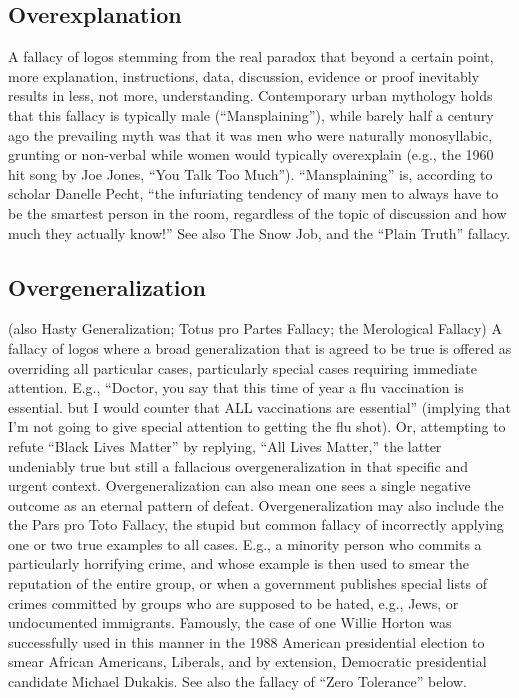 \documentclass[10pt,a4paper,british]{article}
\begin{document}
\begin{multicols}{2}
    \subsection{Overexplanation} A fallacy of logos stemming from the real
    paradox that beyond a certain point, more explanation, instructions, data,
    discussion, evidence or proof inevitably results in less, not more,
    understanding. Contemporary urban mythology holds that this fallacy is
    typically male (``Mansplaining''), while barely half a century ago the
    prevailing myth was that it was men who were naturally monosyllabic,
    grunting or non{-}verbal while women would typically overexplain (e.g., the
    1960 hit song by Joe Jones, ``You Talk Too Much''). ``Mansplaining'' is,
    according to scholar Danelle Pecht, ``the infuriating tendency of many men
    to always have to be the smartest person in the room, regardless of the
    topic of discussion and how much they actually know!''  See also The Snow
    Job, and the ``Plain Truth'' fallacy.

    \subsection{Overgeneralization} (also Hasty Generalization; Totus pro Partes
    Fallacy; the Merological Fallacy) A fallacy of logos where a  broad
    generalization that is agreed to be true is offered as overriding all
    particular cases, particularly special cases requiring immediate attention.
    E.g., ``Doctor, you say that this time of year a  flu vaccination is
    essential. but I would counter that ALL vaccinations are essential''
    (implying that I'm not going to give special attention to getting the flu
    shot). Or, attempting to refute ``Black Lives Matter'' by replying, ``All
    Lives Matter,'' the latter undeniably true but still a fallacious
    overgeneralization in that specific and urgent context.
    Overgeneralization can also mean one sees a single negative outcome as an
    eternal pattern of defeat. Overgeneralization may also include the the Pars
    pro Toto Fallacy, the stupid but common fallacy of incorrectly applying one
    or two true examples to all cases. E.g., a minority person who commits a
    particularly horrifying crime, and whose example is then used to smear the
    reputation of the entire group, or when a government publishes special
    lists of crimes committed by groups who are supposed to be hated, e.g.,
    Jews, or undocumented immigrants. Famously, the case of one Willie Horton
    was successfully used in this manner in the 1988 American presidential
    election to smear African Americans, Liberals, and by extension, Democratic
    presidential candidate Michael Dukakis. See also the fallacy of ``Zero
    Tolerance'' below.


\end{multicols}
\end{document}

